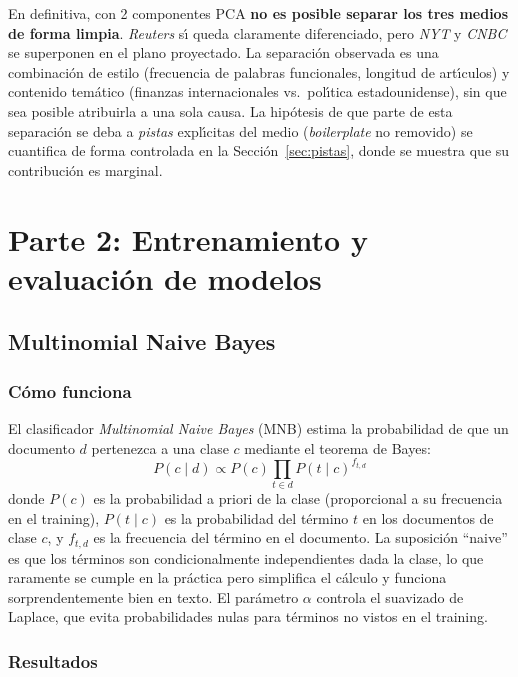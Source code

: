 \documentclass[11pt,a4paper]{article}
\begin{document}
En definitiva, con 2 componentes PCA \textbf{no es posible separar los tres medios de forma limpia}. \textit{Reuters} s\'{\i} queda claramente diferenciado, pero \textit{NYT} y \textit{CNBC} se superponen en el plano proyectado. La separaci\'{o}n observada es una combinaci\'{o}n de estilo (frecuencia de palabras funcionales, longitud de art\'{\i}culos) y contenido tem\'{a}tico (finanzas internacionales vs.\ pol\'{\i}tica estadounidense), sin que sea posible atribuirla a una sola causa. La hip\'{o}tesis de que parte de esta separaci\'{o}n se deba a \textit{pistas} expl\'{\i}citas del medio (\textit{boilerplate} no removido) se cuantifica de forma controlada en la Secci\'{o}n~\ref{sec:pistas}, donde se muestra que su contribuci\'{o}n es marginal.

\section{Parte 2: Entrenamiento y evaluaci\'{o}n de modelos}

\subsection{Multinomial Naive Bayes}

\subsubsection*{C\'{o}mo funciona}

El clasificador \textit{Multinomial Naive Bayes} (MNB) estima la probabilidad de que un documento $d$ pertenezca a una clase $c$ mediante el teorema de Bayes:
\[
P(c \mid d) \propto P(c) \prod_{t \in d} P(t \mid c)^{f_{t,d}}
\]
donde $P(c)$ es la probabilidad a priori de la clase (proporcional a su frecuencia en el training), $P(t \mid c)$ es la probabilidad del t\'{e}rmino $t$ en los documentos de clase $c$, y $f_{t,d}$ es la frecuencia del t\'{e}rmino en el documento. La suposici\'{o}n ``naive'' es que los t\'{e}rminos son condicionalmente independientes dada la clase, lo que raramente se cumple en la pr\'{a}ctica pero simplifica el c\'{a}lculo y funciona sorprendentemente bien en texto. El par\'{a}metro $\alpha$ controla el suavizado de Laplace, que evita probabilidades nulas para t\'{e}rminos no vistos en el training.

\subsubsection*{Resultados}
\end{document}
